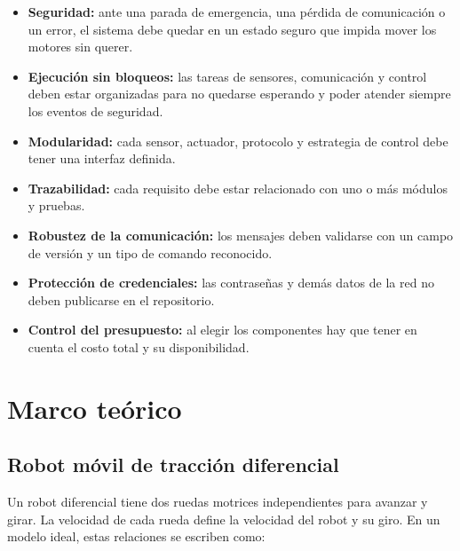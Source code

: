 \documentclass[journal]{IEEEtran}
\begin{document}
\begin{itemize}
    \item \textbf{Seguridad:} ante una parada de emergencia, una pérdida de comunicación o un error, el sistema debe quedar en un estado seguro que impida mover los motores sin querer.

    \item \textbf{Ejecución sin bloqueos:} las tareas de sensores, comunicación y control deben estar organizadas para no quedarse esperando y poder atender siempre los eventos de seguridad.

    \item \textbf{Modularidad:} cada sensor, actuador, protocolo y estrategia de control debe tener una interfaz definida.

    \item \textbf{Trazabilidad:} cada requisito debe estar relacionado con uno o más módulos y pruebas.

    \item \textbf{Robustez de la comunicación:} los mensajes deben validarse con un campo de versión y un tipo de comando reconocido.

    \item \textbf{Protección de credenciales:} las contraseñas y demás datos de la red no deben publicarse en el repositorio.

    \item \textbf{Control del presupuesto:} al elegir los componentes hay que tener en cuenta el costo total y su disponibilidad.
\end{itemize}


\section{Marco teórico}

\subsection{Robot móvil de tracción diferencial}

Un robot diferencial tiene dos ruedas motrices independientes para avanzar y girar. La velocidad de cada rueda define la velocidad del robot y su giro. En un modelo ideal, estas relaciones se escriben como:
\end{document}
